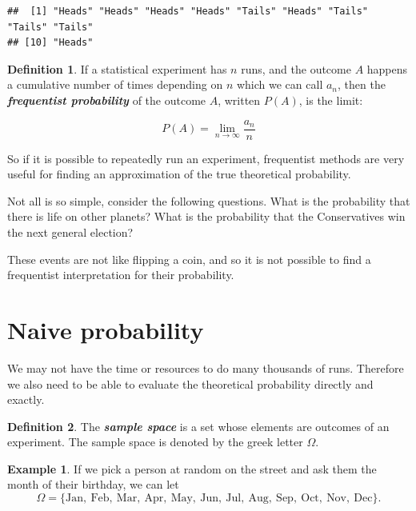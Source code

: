 \documentclass[
]{book}
\theoremstyle{definition}
\newtheorem{definition}{Definition}[chapter]
\theoremstyle{definition}
\newtheorem{example}{Example}[chapter]
\theoremstyle{definition}
\theoremstyle{definition}
\theoremstyle{remark}
\begin{document}
\begin{verbatim}
##  [1] "Heads" "Heads" "Heads" "Heads" "Tails" "Heads" "Tails" "Tails" "Tails"
## [10] "Heads"
\end{verbatim}

\begin{definition}
\protect\hypertarget{def:freq}{}\label{def:freq}If a statistical experiment has \(n\) runs, and the outcome \(A\) happens a cumulative number of times depending on \(n\) which we can call \(a_n\), then the \textbf{\emph{frequentist probability}} of the outcome \(A\), written \(P(A)\), is the limit:

\[P(A) = \lim_{n\to \infty} \frac{a_n}{n}\]
\end{definition}

So if it is possible to repeatedly run an experiment, frequentist methods are very useful for finding an approximation of the true theoretical probability.

Not all is so simple, consider the following questions. What is the probability that there is life on other planets? What is the probability that the Conservatives win the next general election?

These events are not like flipping a coin, and so it is not possible to find a frequentist interpretation for their probability.

\hypertarget{naive-probability}{%
\section{Naive probability}\label{naive-probability}}

We may not have the time or resources to do many thousands of runs. Therefore we also need to be able to evaluate the theoretical probability directly and exactly.

\begin{definition}
\protect\hypertarget{def:samplespace}{}\label{def:samplespace}The \textbf{\emph{sample space}} is a set whose elements are outcomes of an experiment. The sample space is denoted by the greek letter \(\Omega\).
\end{definition}

\begin{example}
\protect\hypertarget{exm:monthspace}{}\label{exm:monthspace}If we pick a person at random on the street and ask them the month of their birthday,
we can let
\[\Omega = \{\text{Jan}, \ \text{Feb}, \ \text{Mar},  \ \text{Apr}, \ \text{May}, \ \text{Jun}, \ \text{Jul}, \ \text{Aug}, \ \text{Sep}, \ \text{Oct}, \ \text{Nov}, \ \text{Dec} \}.\]
\end{example}
\end{document}
